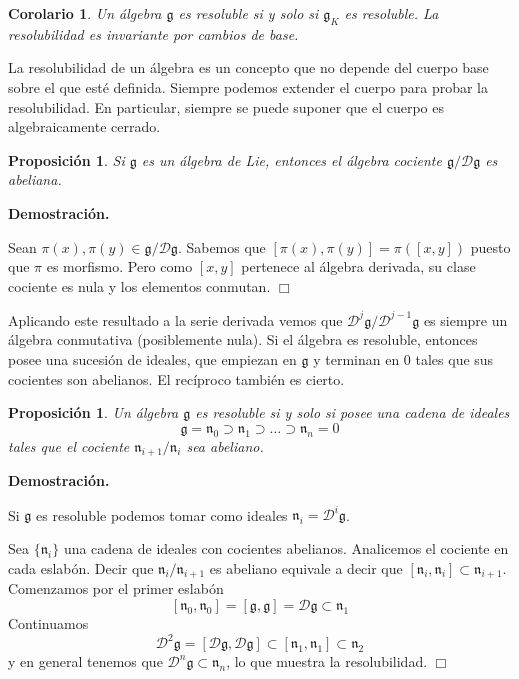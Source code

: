 \documentclass[a4paper,draft,12pt]{article}
\newtheorem{propo}[teo]{Proposición}%
\newtheorem{cor}[teo]{Corolario}%
\newcommand{\dem}{\noindent \textbf{Demostración. }\vspace{0.3 cm}}%
\newcommand{\g}{\mathfrak{g}}%
\newcommand{\fin}{ $\Box $ \vspace{0.4 cm}}
\newcommand{\D}{\mathcal{D}}%
\begin{document}
\begin{cor}

Un álgebra $\g$ es resoluble si y solo si $\g_K$ es resoluble.  La resolubilidad es invariante por cambios de base.

\end{cor}

La resolubilidad de un álgebra es un concepto que no depende del cuerpo base sobre el que esté definida.  Siempre podemos extender el cuerpo para probar la resolubilidad.  En particular, siempre se puede suponer que el cuerpo es algebraicamente cerrado.



\begin{propo}

Si $\g$ es un álgebra de Lie, entonces el álgebra cociente $\g/\D\g$ es abeliana.

\end{propo}

\dem

Sean $\pi(x), \pi(y) \in \g/\D\g$. Sabemos que $[\pi(x),\pi(y)]= \pi([x,y])$ puesto que $\pi$ es morfismo.  Pero como $[x,y]$ pertenece al álgebra derivada, su clase cociente es nula y los elementos conmutan. \fin

Aplicando este resultado a la serie derivada vemos que $\D^j\g/\D^{j-1}\g$ es siempre un álgebra conmutativa (posiblemente nula).  Si el álgebra es resoluble, entonces posee una sucesión de ideales, que empiezan en $\g$ y terminan en $0$ tales que sus cocientes son abelianos.  El recíproco también es cierto.

\begin{propo}

Un álgebra $\g$ es resoluble si y solo si posee una cadena de ideales
$$
\g =\mathfrak{n}_0 \supset \mathfrak{n}_1 \supset \dots \supset \mathfrak{n}_n=0
$$
tales que el cociente $\mathfrak{n}_{i+1}/\mathfrak{n}_i$ sea abeliano.

\end{propo}

\dem

Si $\g$ es resoluble podemos tomar como ideales $\mathfrak{n}_i = \D^i\g$.

\bigskip

Sea $\{\mathfrak{n}_i\}$ una cadena de ideales con cocientes abelianos.  Analicemos el cociente en cada eslabón.  Decir que $\mathfrak{n}_{i}/\mathfrak{n}_{i+1}$ es abeliano equivale a decir que $[\mathfrak{n}_i,\mathfrak{n}_i]\subset \mathfrak{n}_{i+1}$.  Comenzamos por el primer eslabón
$$
[\mathfrak{n}_0,\mathfrak{n}_0]=[\g,\g]=\D\g\subset \mathfrak{n}_1
$$
Continuamos
$$
\D^2 \g = [\D \g,\D\g] \subset [\mathfrak{n}_1,\mathfrak{n}_1]\subset \mathfrak{n}_2
$$
y en general tenemos que $\D^n\g \subset \mathfrak{n}_n$, lo que muestra la resolubilidad.  \fin
\end{document}
